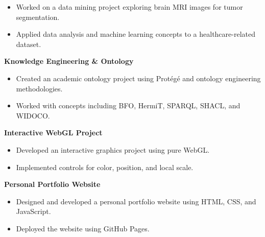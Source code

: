 \documentclass[a4paper,10pt]{article}
\begin{document}
\begin{itemize}[
    leftmargin=*,
    noitemsep,
    topsep=0pt,
    partopsep=0pt,
    parsep=0pt
]

    \item Worked on a data mining project exploring brain MRI images for tumor segmentation.

    \item Applied data analysis and machine learning concepts to a healthcare-related dataset.

\end{itemize}


\noindent
\textbf{Knowledge Engineering \& Ontology}

\begin{itemize}[
    leftmargin=*,
    noitemsep,
    topsep=0pt,
    partopsep=0pt,
    parsep=0pt
]

    \item Created an academic ontology project using Protégé and ontology engineering methodologies.

    \item Worked with concepts including BFO, HermiT, SPARQL, SHACL, and WIDOCO.

\end{itemize}


\noindent
\textbf{Interactive WebGL Project}

\begin{itemize}[
    leftmargin=*,
    noitemsep,
    topsep=0pt,
    partopsep=0pt,
    parsep=0pt
]

    \item Developed an interactive graphics project using pure WebGL.

    \item Implemented controls for color, position, and local scale.

\end{itemize}


\noindent
\textbf{Personal Portfolio Website}

\begin{itemize}[
    leftmargin=*,
    noitemsep,
    topsep=0pt,
    partopsep=0pt,
    parsep=0pt
]

    \item Designed and developed a personal portfolio website using HTML, CSS, and JavaScript.

    \item Deployed the website using GitHub Pages.

\end{itemize}
\end{document}

